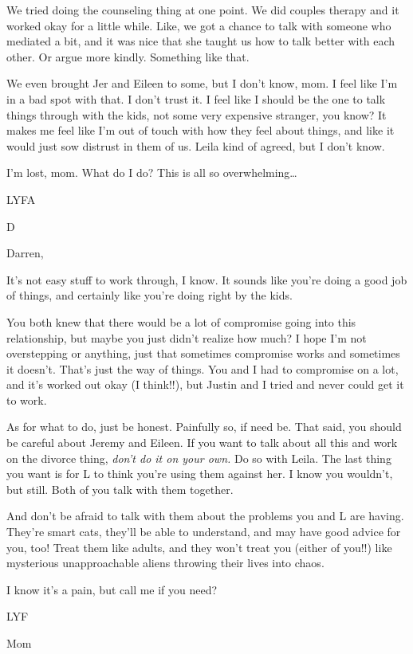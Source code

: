 We tried doing the counseling thing at one point. We did couples therapy and it worked okay for a little while. Like, we got a chance to talk with someone who mediated a bit, and it was nice that she taught us how to talk better with each other. Or argue more kindly. Something like that.

We even brought Jer and Eileen to some, but I don't know, mom. I feel like I'm in a bad spot with that. I don't trust it. I feel like I should be the one to talk things through with the kids, not some very expensive stranger, you know? It makes me feel like I'm out of touch with how they feel about things, and like it would just sow distrust in them of us. Leila kind of agreed, but I don't know.

I'm lost, mom. What do I do? This is all so overwhelming\ldots{}

LYFA

D

\secdiv{}

Darren,

It's not easy stuff to work through, I know. It sounds like you're doing a good job of things, and certainly like you're doing right by the kids.

You both knew that there would be a lot of compromise going into this relationship, but maybe you just didn't realize how much? I hope I'm not overstepping or anything, just that sometimes compromise works and sometimes it doesn't. That's just the way of things. You and I had to compromise on a lot, and it's worked out okay (I think!!), but Justin and I tried and never could get it to work.

As for what to do, just be honest. Painfully so, if need be. That said, you should be careful about Jeremy and Eileen. If you want to talk about all this and work on the divorce thing, \emph{don't do it on your own.} Do so with Leila. The last thing you want is for L to think you're using them against her. I know you wouldn't, but still. Both of you talk with them together.

And don't be afraid to talk with them about the problems you and L are having. They're smart cats, they'll be able to understand, and may have good advice for you, too! Treat them like adults, and they won't treat you (either of you!!) like mysterious unapproachable aliens throwing their lives into chaos.

I know it's a pain, but call me if you need?

LYF

Mom

